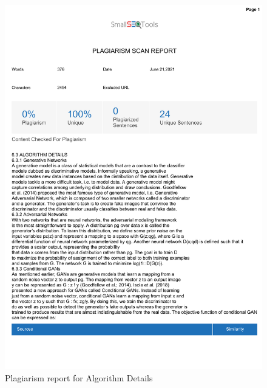 \documentclass[oneside,a4paper,12pt]{report}
\begin{document}
\begin{appendices}
\begin{figure}
	\centering
    \includegraphics[scale=0.7]{plagiarism/algorithm_details.pdf}
    \caption{Plagiarism report for Algorithm Details}
    \label{PlagiarismAlgorithms}
\end{figure}


\end{appendices}
\end{document}
